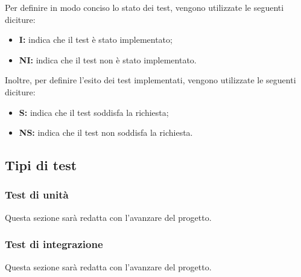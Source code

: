 Per definire in modo conciso lo stato dei test, vengono utilizzate le seguenti diciture:
\begin{itemize}
    \item \textbf{I:} indica che il test è stato implementato;
    \item \textbf{NI:} indica che il test non è stato implementato.
\end{itemize}
Inoltre, per definire l'esito dei test implementati, vengono utilizzate le seguenti diciture:
\begin{itemize}
    \item \textbf{S:} indica che il test soddisfa la richiesta;
    \item \textbf{NS:} indica che il test non soddisfa la richiesta.
\end{itemize}
\subsection{Tipi di test}
\subsubsection{Test di unità}
Questa sezione sarà redatta con l'avanzare del progetto.
\subsubsection{Test di integrazione}
Questa sezione sarà redatta con l'avanzare del progetto.
\pagebreak
